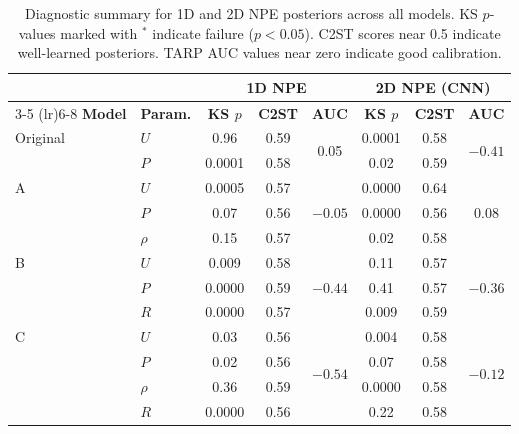 \documentclass{article}
\begin{document}
\begin{table}[htbp]
	\centering
	\renewcommand{\arraystretch}{1.2}
	\begin{tabular}{@{}llcccccc@{}}
		\toprule
		& & \multicolumn{3}{c}{\textbf{1D NPE}} & \multicolumn{3}{c}{\textbf{2D NPE (CNN)}} \\
		\cmidrule(lr){3-5} \cmidrule(lr){6-8}
		\textbf{Model} & \textbf{Param.} & \textbf{KS $p$} & \textbf{C2ST} & \textbf{AUC} & \textbf{KS $p$} & \textbf{C2ST} & \textbf{AUC} \\
		\midrule
		Original & $U$ & 0.96 & 0.59 & \multirow{2}{*}{0.05} & 0.0001\rlap{$^*$} & 0.58 & \multirow{2}{*}{$-0.41$} \\
		         & $P$ & 0.0001\rlap{$^*$} & 0.58 & & 0.02\rlap{$^*$} & 0.59 & \\
		\midrule
		A        & $U$    & 0.0005\rlap{$^*$} & 0.57 & \multirow{3}{*}{$-0.05$} & 0.0000\rlap{$^*$} & 0.64 & \multirow{3}{*}{0.08} \\
		         & $P$    & 0.07   & 0.56 & & 0.0000\rlap{$^*$} & 0.56 & \\
		         & $\rho$ & 0.15   & 0.57 & & 0.02\rlap{$^*$} & 0.58 & \\
		\midrule
		B        & $U$ & 0.009\rlap{$^*$} & 0.58 & \multirow{3}{*}{$-0.44$} & 0.11 & 0.57 & \multirow{3}{*}{$-0.36$} \\
		         & $P$ & 0.0000\rlap{$^*$} & 0.59 & & 0.41 & 0.57 & \\
		         & $R$ & 0.0000\rlap{$^*$} & 0.57 & & 0.009\rlap{$^*$} & 0.59 & \\
		\midrule
		C        & $U$    & 0.03\rlap{$^*$} & 0.56 & \multirow{4}{*}{$-0.54$} & 0.004\rlap{$^*$} & 0.58 & \multirow{4}{*}{$-0.12$} \\
		         & $P$    & 0.02\rlap{$^*$} & 0.56 & & 0.07 & 0.58 & \\
		         & $\rho$ & 0.36 & 0.59 & & 0.0000\rlap{$^*$} & 0.58 & \\
		         & $R$    & 0.0000\rlap{$^*$} & 0.56 & & 0.22 & 0.58 & \\
		\bottomrule
	\end{tabular}
	\caption{Diagnostic summary for 1D and 2D NPE posteriors across all models. KS $p$-values marked with $^*$ indicate failure ($p < 0.05$). C2ST scores near 0.5 indicate well-learned posteriors. TARP AUC values near zero indicate good calibration.}
	\label{tab:diagnostics}
\end{table}
\end{document}
